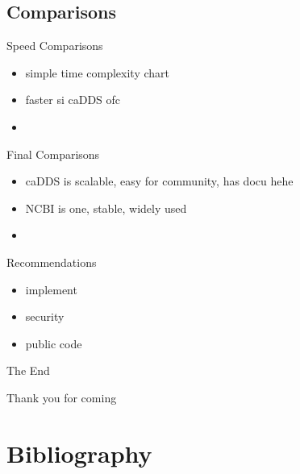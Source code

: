 \documentclass{beamer}
\begin{document}
\subsection{Comparisons}
\begin{frame}{Speed Comparisons}
  \begin{itemize}   
    \item simple time complexity chart
    \item faster si caDDS ofc 
    \item 
  \end{itemize}
\end{frame}


\begin{frame}{Final Comparisons}
  \begin{itemize}   
    \item caDDS is scalable, easy for community, has docu hehe
    \item NCBI is one, stable, widely used
    \item 
  \end{itemize}
\end{frame}


\begin{frame}{Recommendations}
  \begin{itemize}   
    \item implement
    \item security
    \item public code
  \end{itemize}
\end{frame}

\begin{frame}
\Huge{\centerline{The End}}
\small{\centerline{Thank you for coming}}
\end{frame}

\section{Bibliography}

\begin{frame}[allowframebreaks]
\printbibliography[heading=none]
\end{frame}
\end{document}
